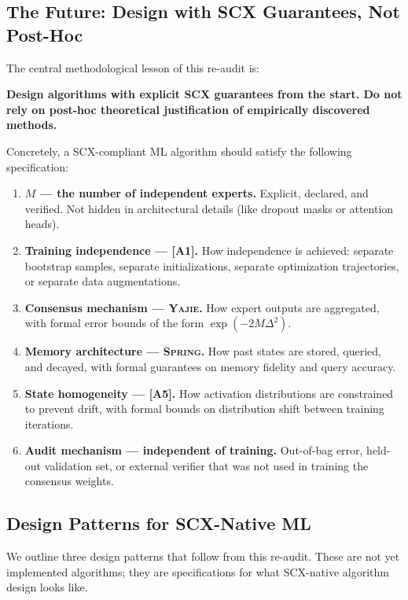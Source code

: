 \documentclass[12pt,a4paper]{article}
\theoremstyle{definition}
\newcommand{\Yajie}{\textsc{Yajie}}
\newcommand{\Spring}{\textsc{Spring}}
\newcommand{\SCX}{\textsc{SCX}}
\newcommand{\asmTag}[1]{\textsf{\textbf{[A#1]}}}
\begin{document}
\subsection{The Future: Design with SCX Guarantees, Not Post-Hoc}

The central methodological lesson of this re-audit is:

\begin{center}
\textbf{Design algorithms with explicit \SCX{} guarantees from the start. Do not rely on post-hoc theoretical justification of empirically discovered methods.}
\end{center}

Concretely, a \SCX{}-compliant ML algorithm should satisfy the following specification:

\begin{enumerate}[label=(\roman*)]
    \item \textbf{$M$ — the number of independent experts.} Explicit, declared, and verified. Not hidden in architectural details (like dropout masks or attention heads).
    \item \textbf{Training independence — \asmTag{1}.} How independence is achieved: separate bootstrap samples, separate initializations, separate optimization trajectories, or separate data augmentations.
    \item \textbf{Consensus mechanism — \Yajie{}.} How expert outputs are aggregated, with formal error bounds of the form $\exp(-2M\Delta^2)$.
    \item \textbf{Memory architecture — \Spring{}.} How past states are stored, queried, and decayed, with formal guarantees on memory fidelity and query accuracy.
    \item \textbf{State homogeneity — \asmTag{5}.} How activation distributions are constrained to prevent drift, with formal bounds on distribution shift between training iterations.
    \item \textbf{Audit mechanism — independent of training.} Out-of-bag error, held-out validation set, or external verifier that was not used in training the consensus weights.
\end{enumerate}

\subsection{Design Patterns for SCX-Native ML}

We outline three design patterns that follow from this re-audit. These are not yet implemented algorithms; they are specifications for what \SCX{}-native algorithm design looks like.
\end{document}
